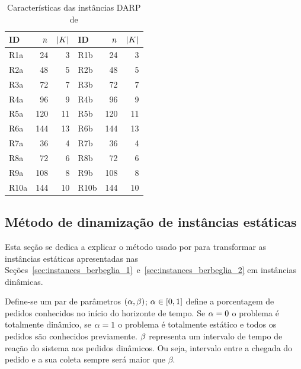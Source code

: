 \begin{table}[h]
\footnotesize
  \centering
  \caption{Características das instâncias DARP de 
           \textcite{cordeau_tabu_2003}}
  \label{tab:cordeau_tabu_2003_DARP_intances_characteristics}
  \begin{tabular}{lrr|lrr}
    \toprule  
    ID & $n$ & $|K|$ & 
    ID & $n$ & $|K|$\\
    \midrule
      R1a  &  24 &  3 & R1b  &  24 &  3\\
      R2a  &  48 &  5 & R2b  &  48 &  5\\
      R3a  &  72 &  7 & R3b  &  72 &  7\\
      R4a  &  96 &  9 & R4b  &  96 &  9\\
      R5a  & 120 & 11 & R5b  & 120 & 11\\
      R6a  & 144 & 13 & R6b  & 144 & 13\\
      R7a  &  36 &  4 & R7b  &  36 &  4\\
      R8a  &  72 &  6 & R8b  &  72 &  6\\
      R9a  & 108 &  8 & R9b  & 108 &  8\\
      R10a & 144 & 10 & R10b & 144 & 10\\
    \bottomrule
  \end{tabular}
\end{table}

\subsection{Método de dinamização de instâncias estáticas}

Esta seção se dedica a explicar o método usado por
\textcite{berbeglia_hybrid_tabu_2012} para transformar as instâncias
estáticas apresentadas nas
Seções~\ref{sec:instances_berbeglia_1}~e~\ref{sec:instances_berbeglia_2} em
instâncias dinâmicas.

Define-se um par de parâmetros $(\alpha,\beta)$;
$\alpha \in [0, 1]$ define a porcentagem de pedidos conhecidos no 
início do horizonte de tempo.
Se $\alpha = 0$ o problema é totalmente dinâmico, 
se $\alpha = 1$ o problema é totalmente estático e todos os pedidos
são conhecidos previamente.  
$\beta$ representa um intervalo de tempo de reação do sistema aos
pedidos dinâmicos. Ou seja, intervalo entre a chegada do pedido e a sua coleta 
sempre será maior que $\beta$.

